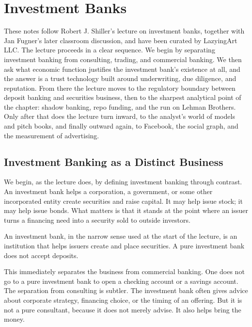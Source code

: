 \chapter{Investment Banks}

These notes follow Robert J. Shiller's lecture on investment banks, together with Jan Fugner's later classroom discussion, and have been curated by LazyingArt LLC. The lecture proceeds in a clear sequence. We begin by separating investment banking from consulting, trading, and commercial banking. We then ask what economic function justifies the investment bank's existence at all, and the answer is a trust technology built around underwriting, due diligence, and reputation. From there the lecture moves to the regulatory boundary between deposit banking and securities business, then to the sharpest analytical point of the chapter: shadow banking, repo funding, and the run on Lehman Brothers. Only after that does the lecture turn inward, to the analyst's world of models and pitch books, and finally outward again, to Facebook, the social graph, and the measurement of advertising.

\section{Investment Banking as a Distinct Business}

We begin, as the lecture does, by defining investment banking through contrast. An investment bank helps a corporation, a government, or some other incorporated entity create securities and raise capital. It may help issue stock; it may help issue bonds. What matters is that it stands at the point where an issuer turns a financing need into a security sold to outside investors.

\begin{definition}
An investment bank, in the narrow sense used at the start of the lecture, is an institution that helps issuers create and place securities. A pure investment bank does not accept deposits.
\end{definition}

This immediately separates the business from commercial banking. One does not go to a pure investment bank to open a checking account or a savings account. The separation from consulting is subtler. The investment bank often gives advice about corporate strategy, financing choice, or the timing of an offering. But it is not a pure consultant, because it does not merely advise. It also helps bring the money.

